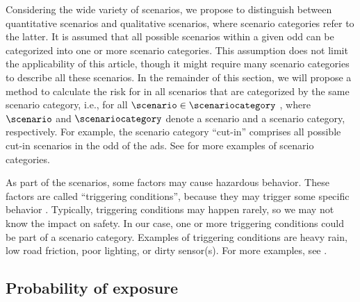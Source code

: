 Considering the wide variety of scenarios, we propose to distinguish between quantitative scenarios and qualitative scenarios, where scenario categories refer to the latter.
It is assumed that all possible scenarios within a given \ac{odd} can be categorized into one or more scenario categories. 
This assumption does not limit the applicability of this article, though it might require many scenario categories to describe all these scenarios.
In the remainder of this section, we will propose a method to calculate the risk for  in all scenarios that are categorized by the same scenario category, i.e., for all $\scenario \in \scenariocategory$ \autocite{degelder2021ontology}, where $\scenario$ and $\scenariocategory$ denote a scenario and a scenario category, respectively.
For example, the scenario category ``cut-in'' comprises all possible cut-in scenarios in the \ac{odd} of the \ac{ads}.
See \autocite{degelder2019scenariocategories} for more examples of scenario categories.


\begin{remark}
	As part of the scenarios, some factors may cause hazardous behavior. 
	These factors are called ``triggering conditions'', because they may trigger some specific behavior \autocite{ISO21448}.
	Typically, triggering conditions may happen rarely, so we may not know the impact on safety. 
	In our case, one or more triggering conditions could be part of a scenario category.
	Examples of triggering conditions are heavy rain, low road friction, poor lighting, or dirty sensor(s). 
	For more examples, see \autocite{ISO21448}.
\end{remark}



\subsection{Probability of exposure}
\label{sec:exposure}


